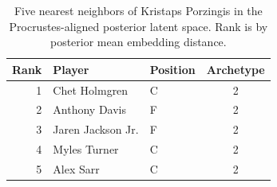 \begin{table}[htbp]
  \centering\small
  \begin{tabular}{rllc}
    \toprule
    Rank & Player & Position & Archetype \\
    \midrule
    1 & Chet Holmgren & C & 2 \\
    2 & Anthony Davis & F & 2 \\
    3 & Jaren Jackson Jr. & F & 2 \\
    4 & Myles Turner & C & 2 \\
    5 & Alex Sarr & C & 2 \\
    \bottomrule
  \end{tabular}
  \caption{Five nearest neighbors of Kristaps Porzingis in the Procrustes-aligned posterior latent space. Rank is by posterior mean embedding distance.}
  \label{tab:Kristaps_Porzingis_neighbors}
\end{table}

